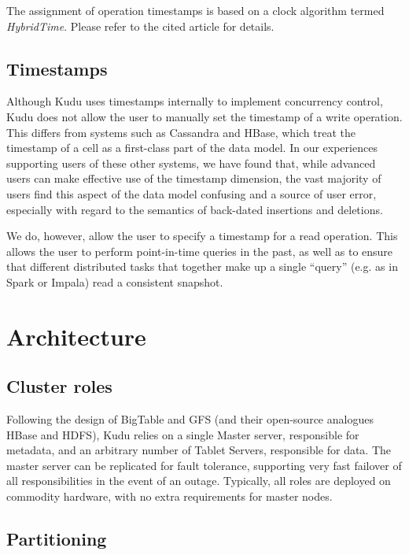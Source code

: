\documentclass{vldb}
\begin{document}
The assignment of operation timestamps is based on a clock algorithm termed {\em HybridTime}\cite{hybridtime}.
Please refer to the cited article for details.

\subsection{Timestamps}

Although Kudu uses timestamps internally to implement concurrency control, Kudu does not allow
the user to manually set the timestamp of a write operation. This differs from systems such as
Cassandra and HBase, which treat the timestamp of a cell as a first-class part of the data model.
In our experiences supporting users of these other systems, we have found that, while advanced users
can make effective use of the timestamp dimension, the vast majority of users find this aspect of the data model
confusing and a source of user error, especially with regard to the semantics of back-dated insertions and deletions.

We do, however, allow the user to specify a timestamp for a read operation. This allows the user to perform
point-in-time queries in the past, as well as to ensure that different distributed tasks that together
make up a single ``query'' (e.g. as in Spark or Impala) read a consistent snapshot.

\section{Architecture}
\label{sec:architecture}

\subsection{Cluster roles}

Following the design of BigTable and GFS\cite{gfs} (and their open-source analogues HBase and HDFS), Kudu
relies on a single Master server, responsible for metadata, and an arbitrary number of Tablet
Servers, responsible for data. The master server can be replicated for fault tolerance, supporting
very fast failover of all responsibilities in the event of an outage. Typically, all roles are deployed
on commodity hardware, with no extra requirements for master nodes.

\subsection{Partitioning}
\label{sec:partitioning}
\end{document}

